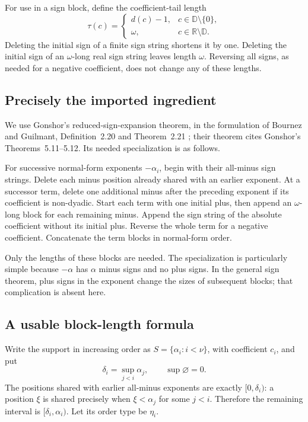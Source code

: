 \documentclass[11pt,letterpaper]{article}
\theoremstyle{definition}
\theoremstyle{remark}
\newcommand{\R}{\mathbb{R}}
\newcommand{\D}{\mathbb{D}}
\begin{document}
For use in a sign block, define the coefficient-tail length
\begin{equation}\label{eq:tail}
 \tau(c)=
 \begin{cases}
 d(c)-1,&c\in\D\setminus\{0\},\\
 \omega,&c\in\R\setminus\D.
 \end{cases}
\end{equation}
Deleting the initial sign of a finite sign string shortens it by one.
Deleting the initial sign of an \(\omega\)-long real sign string leaves
length \(\omega\). Reversing all signs, as needed for a negative
coefficient, does not change any of these lengths.

\subsection{Precisely the imported ingredient}
We use Gonshor's reduced-sign-expansion theorem, in the formulation of
Bournez and Guilmant, Definition~2.20 and Theorem~2.21
\cite{BournezGuilmant}; their theorem cites Gonshor's
Theorems~5.11--5.12. Its needed specialization is as follows.

\begin{resultbox}
For successive normal-form exponents \(-\alpha_i\), begin with their
all-minus sign strings. Delete each minus position already shared with
an earlier exponent. At a successor term, delete one additional minus
after the preceding exponent if its coefficient is non-dyadic. Start each term with one initial plus, then append an \(\omega\)-long
block for each remaining minus. Append the sign string of the absolute
coefficient without its initial plus. Reverse the whole term for a negative
coefficient. Concatenate the term blocks in normal-form order.
\end{resultbox}

Only the lengths of these blocks are needed. The specialization is
particularly simple because \(-\alpha\) has \(\alpha\) minus signs and
no plus signs. In the general sign theorem, plus signs in the exponent
change the sizes of subsequent blocks; that complication is absent here.

\subsection{A usable block-length formula}
Write the support in increasing order as
\(S=\{\alpha_i:i<\nu\}\), with coefficient \(c_i\), and put
\[
 \delta_i=\sup_{j<i}\alpha_j,\qquad\sup\varnothing=0.
\]
The positions shared with earlier all-minus exponents are exactly
\([0,\delta_i)\): a position \(\xi\) is shared precisely when
\(\xi<\alpha_j\) for some \(j<i\). Therefore the remaining interval
is \([\delta_i,\alpha_i)\). Let its order type be \(\eta_i\).
\end{document}
